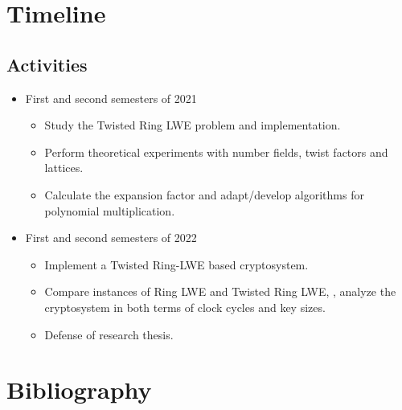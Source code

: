 \documentclass[a4paper,12pt]{article}
\begin{document}
\section{Timeline}
\label{timeline}
\subsection{Activities}
\label{sec:org7a223f9}
\begin{itemize}
\item First and second semesters of 2021
\begin{itemize}
\item Study the Twisted Ring LWE problem and implementation.
\item Perform theoretical experiments with number fields, twist factors and lattices.
\item Calculate the expansion factor and adapt/develop algorithms for polynomial multiplication.
\end{itemize}
\item First and second semesters of 2022
\begin{itemize}
\item Implement a Twisted Ring-LWE based cryptosystem.
\item Compare instances of Ring LWE and Twisted Ring LWE, \ie, analyze the cryptosystem in both terms of clock cycles and key sizes.
\item Defense of research thesis.
\end{itemize}
\end{itemize}

\section*{Bibliography}
\label{bibliography}


\end{document}
